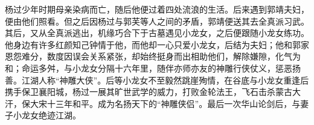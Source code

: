 \documentclass[print, doctor, vlined]{DissertUESTC}
\begin{document}

	
	
	\zhabstract
	
	杨过少年时期母亲染病而亡，随后他便过着四处流浪的生活。后来遇到郭靖夫妇，便由他们照看。但之后因杨过与郭芙等人之间的矛盾，郭靖便送其去全真派习武。其后，又从全真派逃出，机缘巧合下于古墓遇见小龙女，之后便跟随小龙女练功。他身边有许多红颜知己钟情于他，而他却一心只爱小龙女，后结为夫妇；他和郭家恩怨难分，数度因误会关系紧张，却始终挺身而出相助他们，解除嫌隙，化气为和；命运多舛，与小龙女分隔十六年里，随伴亦师亦友的神雕行侠仗义，惩恶扬善。江湖人称“神雕大侠”。后等小龙女不至毅然跳崖殉情，在谷底与小龙女重逢后携手保卫襄阳城，杨过一展其旷世武学的威力，打败金轮法王，飞石击杀蒙古大汗，保大宋十三年和平。成为名扬天下的“神雕侠侣”。最后一次华山论剑后，与妻子小龙女绝迹江湖。




\end{document}
